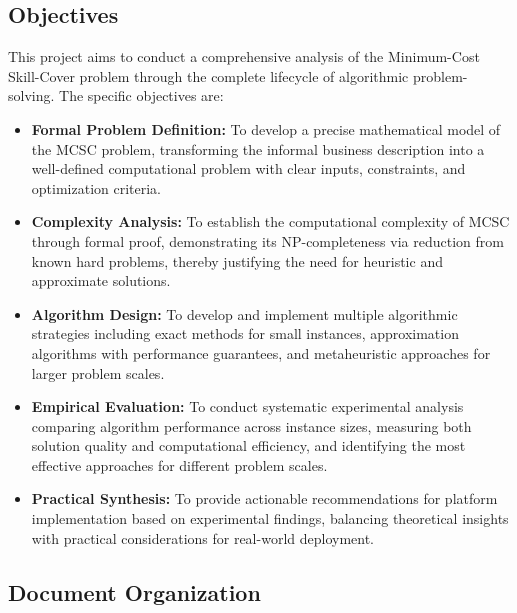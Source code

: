 \documentclass[12pt,a4paper]{article}
\begin{document}
\subsection{Objectives}
\label{subsec:objectives}

This project aims to conduct a comprehensive analysis of the Minimum-Cost Skill-Cover problem through the complete lifecycle of algorithmic problem-solving. The specific objectives are:

\begin{itemize}
	\item \textbf{Formal Problem Definition:} To develop a precise mathematical model of the MCSC problem, transforming the informal business description into a well-defined computational problem with clear inputs, constraints, and optimization criteria.
	
	\item \textbf{Complexity Analysis:} To establish the computational complexity of MCSC through formal proof, demonstrating its NP-completeness via reduction from known hard problems, thereby justifying the need for heuristic and approximate solutions.
	
	\item \textbf{Algorithm Design:} To develop and implement multiple algorithmic strategies including exact methods for small instances, approximation algorithms with performance guarantees, and metaheuristic approaches for larger problem scales.
	
	\item \textbf{Empirical Evaluation:} To conduct systematic experimental analysis comparing algorithm performance across instance sizes, measuring both solution quality and computational efficiency, and identifying the most effective approaches for different problem scales.
	
	\item \textbf{Practical Synthesis:} To provide actionable recommendations for platform implementation based on experimental findings, balancing theoretical insights with practical considerations for real-world deployment.
\end{itemize}

\subsection{Document Organization}
\label{subsec:organization}
\end{document}
